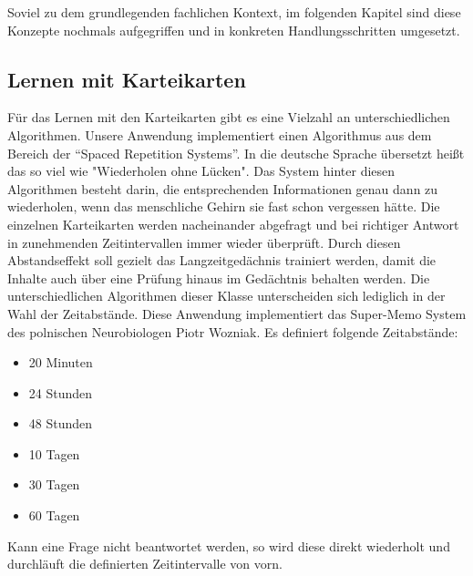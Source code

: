 Soviel zu dem grundlegenden fachlichen Kontext, im folgenden Kapitel sind diese Konzepte nochmals aufgegriffen und in konkreten Handlungsschritten umgesetzt. 

%


\subsection{Lernen mit Karteikarten}
Für das Lernen mit den Karteikarten gibt es eine Vielzahl an unterschiedlichen Algorithmen. Unsere Anwendung implementiert einen Algorithmus aus dem Bereich der \enquote{Spaced Repetition Systems}. In die deutsche Sprache übersetzt heißt das so viel wie "Wiederholen ohne Lücken". Das System hinter diesen Algorithmen besteht darin, die entsprechenden Informationen genau dann zu wiederholen, wenn das menschliche Gehirn sie fast schon vergessen hätte.\autocite[Vgl.][]{Tabibian3988} Die einzelnen Karteikarten werden nacheinander abgefragt und bei richtiger Antwort in zunehmenden Zeitintervallen immer wieder überprüft. Durch diesen Abstandseffekt soll gezielt das Langzeitgedächnis trainiert werden, damit die Inhalte auch über eine Prüfung hinaus im Gedächtnis behalten werden. Die unterschiedlichen Algorithmen dieser Klasse unterscheiden sich lediglich in der Wahl der Zeitabstände. 
Diese Anwendung implementiert das Super-Memo System des polnischen Neurobiologen Piotr Wozniak. Es definiert folgende Zeitabstände:
\begin{itemize}
	\item 20 Minuten
	\item 24 Stunden
	\item 48 Stunden
	\item 10 Tagen
	\item 30 Tagen
	\item 60 Tagen
\end{itemize}  
Kann eine Frage nicht beantwortet werden, so wird diese direkt wiederholt und durchläuft die definierten Zeitintervalle von vorn. \autocite[Vgl.][]{BaileyuDavey}



